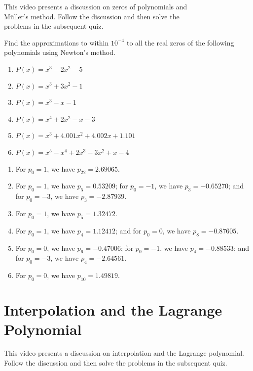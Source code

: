 \begin{youtube}
This video presents a discussion on zeros of polynomials and \\M\"uller's method. Follow the discussion and then solve the\\ problems in the subsequent quiz.\\
\end{youtube}



\begin{myexercise}%
Find the approximations to within $10^{-4}$ to all the real zeros of the following polynomials using Newton's method.
\begin{enumerate}[label=(\alph*)]
\item $P(x)=x^{3}-2 x^{2}-5$
\item $P(x)=x^{3}+3 x^{2}-1$
\item $P(x)=x^{3}- x-1$
\item $P(x)=x^{4}+2 x^{2}-x-3$
\item $P(x)=x^{3}+4.001 x^{2}+4.002x+1.101$
\item $P(x)=x^{5}-x^{4}+2 x^{3}-3 x^{2}+x-4$
\end{enumerate}
\begin{mysolution}
\begin{enumerate}[label=(\alph*)]
\item For $p_0=1$, we have $p_{22}=2.69065$.
\item For $p_0=1$, we have $p_5=0.53209$; for $p_0=-1$, we have $p_3=-0.65270$; and for $p_0=-3$, we have $p_3=-2.87939$.
\item For $p_0=1$, we have $p_5=1.32472$.
\item For $p_0=1$, we have $p_4=1.12412$; and for $p_0=0$, we have $p_8=-0.87605$.
\item For $p_0=0$, we have $p_6=-0.47006$; for $p_0=-1$, we have $p_4=-0.88533$; and for $p_0=-3$, we have $p_4=-2.64561$.
\item For $p_0=0$, we have $p_{10}=1.49819$.
\end{enumerate}
\end{mysolution}
\end{myexercise}


\section{Interpolation and the Lagrange Polynomial}
\videolesson
\begin{selfvideo}[2]
This video presents a discussion on interpolation and the Lagrange polynomial. Follow the discussion and then solve the problems in the subsequent quiz.
\end{selfvideo}

